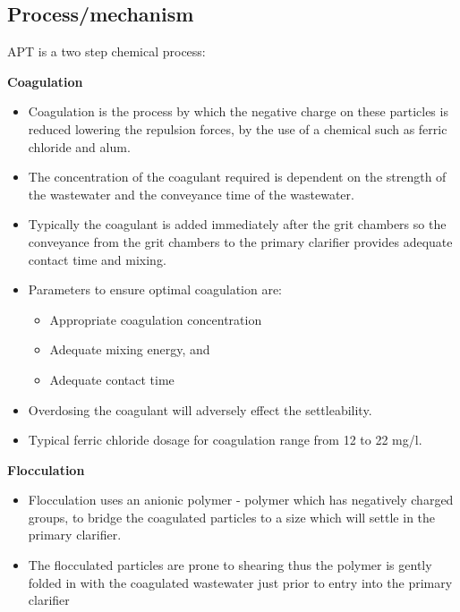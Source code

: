 \subsection{Process/mechanism}    

APT is a two step chemical process:

\textbf{Coagulation}
				                \begin{itemize}
									\item Coagulation is the process by which the negative charge on these particles is reduced lowering the repulsion forces, by the use of a chemical such as ferric chloride and alum.\\
									\item The concentration of the coagulant required is dependent on the strength of the wastewater and the conveyance time of the wastewater.
									\item Typically the coagulant is added immediately after the grit chambers so the conveyance from the grit chambers to the primary clarifier provides adequate contact time and mixing.\\
									\item Parameters to ensure optimal coagulation are:
										\begin{itemize}
											\item Appropriate coagulation concentration
											\item Adequate mixing energy, and
											\item Adequate contact time
										\end{itemize}
									\item Overdosing the coagulant will adversely effect the settleability.
									\item Typical ferric chloride dosage for coagulation range from 12 to 22 mg/l.
								\end{itemize}
\textbf{Flocculation}
			                	\begin{itemize}
									\item Flocculation uses an anionic polymer - polymer which has negatively charged groups, to bridge the coagulated particles to a size which will settle in the primary clarifier.  
									\item The flocculated particles are prone to shearing thus the polymer is gently folded in with the coagulated wastewater just prior to entry into the primary clarifier
								\end{itemize}
					


